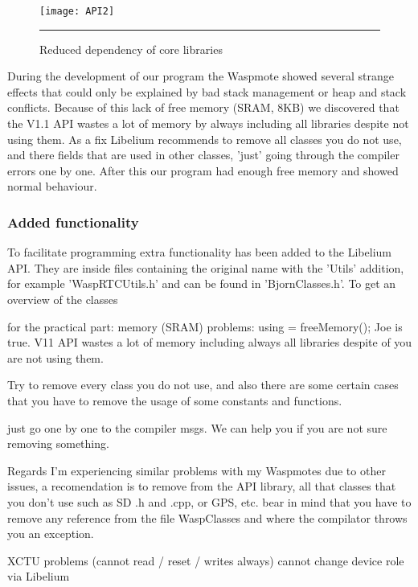 \begin{figure}[ht]
\centering
\texttt{[image: API2]}
\rule{30em}{0.5pt}
\caption{Reduced dependency of core libraries}
\label{fig:API2}
\end{figure}

During the development of our program the Waspmote showed several strange effects that could only be explained by bad stack management or heap and stack conflicts. Because of this lack of free memory (SRAM, 8KB) we discovered that the V1.1 API wastes a lot of memory by always including all libraries despite not using them. As a fix Libelium recommends to remove all classes you do not use, and there fields that are used in other classes, 'just' going through the compiler errors one by one. After this our program had enough free memory and showed normal behaviour.
\subsubsection{Added functionality}
To facilitate programming extra functionality has been added to the Libelium API. They are inside files containing the original name with the 'Utils' addition, for example 'WaspRTCUtils.h' and can be found in 'BjornClasses.h'. To get an overview of the classes  

for the practical part: memory (SRAM) problems:  using  = freeMemory();
Joe is true. V11 API wastes a lot of memory including always all libraries despite of you are not using them.

Try to remove every class you do not use, and also there are some certain cases that you have to remove the usage of some constants and functions.

just go one by one to the compiler msgs. We can help you if you are not sure removing something.

Regards
I'm experiencing similar problems with my Waspmotes due to other issues, a recomendation is to remove from the API library, all that classes that you don't use such as SD .h and .cpp, or GPS, etc. bear in mind that you have to remove any reference from the file WaspClasses and where the compilator throws you an exception.

XCTU problems (cannot read / reset / writes always)  cannot change device role via Libelium
  
